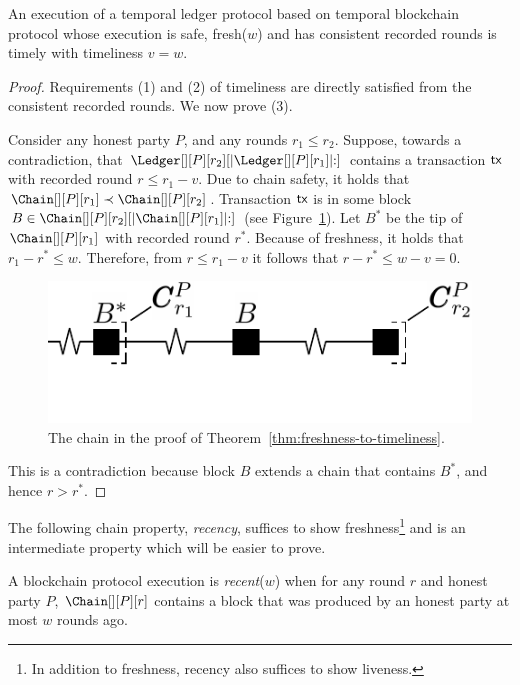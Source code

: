 \begin{theorem} \label{thm:freshness-to-timeliness}
  An execution of a temporal ledger protocol based on
  temporal blockchain protocol
  whose execution is safe, fresh($w$) and has consistent recorded rounds is timely with timeliness $v = w$.
\end{theorem}
\begin{proof}
  Requirements (1) and (2) of timeliness are directly satisfied from
  the consistent recorded rounds.
  We now prove (3).

  Consider any honest party $P$, and any rounds $r_1 \leq r_2$.
  Suppose, towards a contradiction, that $\Ledger[][P][r_2][|\Ledger[][P][r_1]|{:}]$
  contains a transaction $\textsf{tx}$ with recorded round $r \leq r_1 - v$.
  Due to chain safety, it holds that $\Chain[][P][r_1] \prec \Chain[][P][r_2]$.
  Transaction $\textsf{tx}$ is in some block $B \in \Chain[][P][r_2][|\Chain[][P][r_1]|{:}]$
  (see Figure~\ref{fig:freshness-to-timeliness}).
  Let $B^*$ be the tip of $\Chain[][P][r_1]$ with recorded round $r^*$.
  Because of freshness, it holds that $r_1 - r^* \leq w$.
  Therefore, from $r \leq r_1 - v$ it follows that $r - r^* \leq w - v = 0$.

  \iflncs
    \begin{figure}
      \centering
      \includegraphics[width=0.5\columnwidth,keepaspectratio]{figures/freshness-timeliness.pdf}
      \caption{The chain in the proof of Theorem~\ref{thm:freshness-to-timeliness}.}
      \label{fig:freshness-to-timeliness}
    \end{figure}
  \fi

  This is a contradiction because block $B$ extends a chain that contains $B^*$,
  and hence $r > r^*$.
  \Qed
\end{proof}

The following chain property, \emph{recency}, suffices to show freshness\footnote{
  In addition to freshness, recency also suffices to show liveness.
} and is an intermediate property which will be easier to prove.

\begin{definition}[Recency]
  A blockchain protocol execution is \emph{recent}($w$)
  when for any round $r$ and honest party $P$, $\Chain[][P][r]$
  contains a block that was produced by an honest party
  at most $w$ rounds ago.
\end{definition}

